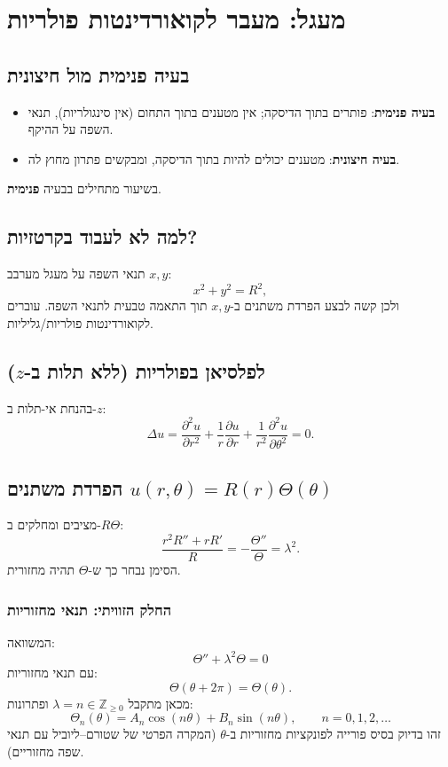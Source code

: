 \section{מעגל: מעבר לקואורדינטות פולריות}
\subsection{בעיה פנימית מול חיצונית}
\begin{itemize}
  \item \textbf{בעיה פנימית}: פותרים בתוך הדיסקה; אין מטענים בתוך התחום (אין סינגולריות), תנאי השפה על ההיקף.
  \item \textbf{בעיה חיצונית}: מטענים יכולים להיות בתוך הדיסקה, ומבקשים פתרון מחוץ לה.
\end{itemize}
בשיעור מתחילים בבעיה \textbf{פנימית}.

\subsection{למה לא לעבוד בקרטזיות?}
תנאי השפה על מעגל מערבב $x,y$:
\[
x^2+y^2=R^2,
\]
ולכן קשה לבצע הפרדת משתנים ב-$x,y$ תוך התאמה טבעית לתנאי השפה. עוברים לקואורדינטות פולריות/גליליות.

\subsection{לפלסיאן בפולריות (ללא תלות ב-\(z\))}
בהנחת אי-תלות ב-$z$:
\begin{equation}
\Delta u=
\frac{\partial^2 u}{\partial r^2}
+\frac{1}{r}\frac{\partial u}{\partial r}
+\frac{1}{r^2}\frac{\partial^2 u}{\partial \theta^2}
=0.
\end{equation}

\subsection{הפרדת משתנים \(u(r,\theta)=R(r)\Theta(\theta)\)}
מציבים ומחלקים ב-$R\Theta$:
\[
\frac{r^2R''+rR'}{R}=-\frac{\Theta''}{\Theta}=\lambda^2.
\]
הסימן נבחר כך ש-\(\Theta\) תהיה מחזורית.

\subsubsection*{החלק הזוויתי: תנאי מחזוריות}
המשוואה:
\[
\Theta''+\lambda^2\Theta=0
\]
עם תנאי מחזוריות:
\[
\Theta(\theta+2\pi)=\Theta(\theta).
\]
מכאן מתקבל \(\lambda=n\in\mathbb{Z}_{\ge 0}\) ופתרונות:
\begin{equation}
\Theta_n(\theta)=A_n\cos(n\theta)+B_n\sin(n\theta),\qquad n=0,1,2,\dots
\end{equation}
זהו בדיוק בסיס פורייה לפונקציות מחזוריות ב-\(\theta\) (המקרה הפרטי של שטורם--ליוביל עם תנאי שפה מחזוריים).

